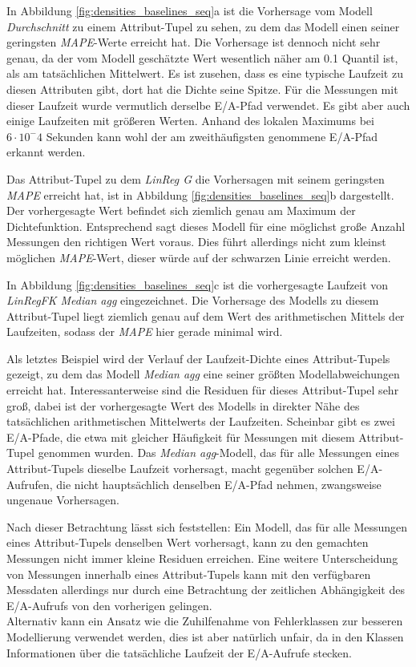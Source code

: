\documentclass[
	twoside,
	12pt,
	a4paper,
	BCOR10mm,
	DIV14,
	listof=totoc,
	bibliography=totoc,
	headsepline
]{scrreprt}
\begin{document}
In Abbildung \ref{fig:densities_baselines_seq}a ist die Vorhersage vom Modell \textit{Durchschnitt} zu einem Attribut-Tupel zu sehen, zu dem das Modell einen seiner geringsten \textit{MAPE}-Werte erreicht hat.
Die Vorhersage ist dennoch nicht sehr genau, da der vom Modell geschätzte Wert wesentlich näher am 0.1 Quantil ist, als am tatsächlichen Mittelwert.
Es ist zusehen, dass es eine typische Laufzeit zu diesen Attributen gibt, dort hat die Dichte seine Spitze. Für die Messungen mit dieser Laufzeit wurde vermutlich derselbe E/A-Pfad verwendet. Es gibt aber auch einige Laufzeiten mit größeren Werten.
Anhand des lokalen Maximums bei $6\cdot 10^-4$ Sekunden kann wohl der am zweithäufigsten genommene E/A-Pfad erkannt werden.\medskip

Das Attribut-Tupel zu dem \textit{LinReg G} die Vorhersagen mit seinem geringsten \textit{MAPE} erreicht hat, ist in Abbildung \ref{fig:densities_baselines_seq}b dargestellt.
Der vorhergesagte Wert befindet sich ziemlich genau am Maximum der Dichtefunktion. Entsprechend sagt dieses Modell für eine möglichst große Anzahl Messungen den richtigen Wert voraus. Dies führt allerdings nicht zum kleinst möglichen \textit{MAPE}-Wert, dieser würde auf der schwarzen Linie erreicht werden.\medskip
 
In Abbildung \ref{fig:densities_baselines_seq}c ist die vorhergesagte Laufzeit von \textit{LinRegFK Median agg} eingezeichnet.
Die Vorhersage des Modells zu diesem Attribut-Tupel liegt ziemlich genau auf dem Wert des arithmetischen Mittels der Laufzeiten, sodass der \textit{MAPE} hier gerade minimal wird.\medskip

Als letztes Beispiel wird der Verlauf der Laufzeit-Dichte eines Attribut-Tupels gezeigt, zu dem das Modell \textit{Median agg} eine seiner größten Modellabweichungen erreicht hat.
Interessanterweise sind die Residuen für dieses Attribut-Tupel sehr groß, dabei ist der vorhergesagte Wert des Modells in direkter Nähe des tatsächlichen arithmetischen Mittelwerts der Laufzeiten.
Scheinbar gibt es zwei E/A-Pfade, die etwa mit gleicher Häufigkeit für Messungen mit diesem Attribut-Tupel genommen wurden. 
Das \textit{Median agg}-Modell, das für alle Messungen eines Attribut-Tupels dieselbe Laufzeit vorhersagt, macht gegenüber solchen E/A-Aufrufen, die nicht hauptsächlich denselben E/A-Pfad nehmen, zwangsweise ungenaue Vorhersagen. \medskip

Nach dieser Betrachtung lässt sich feststellen:
Ein Modell, das für alle Messungen eines Attribut-Tupels denselben Wert vorhersagt, kann zu den gemachten Messungen nicht immer kleine Residuen erreichen.
Eine weitere Unterscheidung von Messungen innerhalb eines Attribut-Tupels kann mit den verfügbaren Messdaten allerdings nur durch eine Betrachtung der zeitlichen Abhängigkeit des E/A-Aufrufs von den vorherigen gelingen.\\
Alternativ kann ein Ansatz wie die Zuhilfenahme von Fehlerklassen zur besseren Modellierung verwendet werden, dies ist aber natürlich \glqq unfair\grqq{}, da in den Klassen Informationen über die tatsächliche Laufzeit der E/A-Aufrufe stecken.
 
\end{document}
